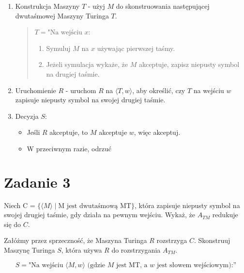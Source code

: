 \documentclass{article}
\begin{document}
\begin{enumerate}
    \item Konstrukcja Maszyny $T$ - użyj $M$ do skonstruowania następującej dwutaśmowej Maszyny Turinga $T$.
    \begin{quote}
    $T = \text{"Na wejściu } x$:
    \begin{enumerate}
        \item Symuluj $M$ na $x$ używając pierwszej taśmy.
        \item Jeżeli symulacja wykaże, że $M$ akceptuje, zapisz niepusty symbol na drugiej taśmie.
    \end{enumerate}
    \end{quote}

    \item Uruchomienie $R$ - uruchom $R$ na $\langle T, w \rangle$, aby określić, czy $T$ na wejściu $w$ zapisuje niepusty symbol na swojej drugiej taśmie.

    \item Decyzja $S$:
    \begin{itemize}
        \item Jeśli $R$ akceptuje, to $M$ akceptuje $w$, więc akceptuj.
        \item W przeciwnym razie, odrzuć
    \end{itemize}
\end{enumerate}

\section{Zadanie 3}
Niech C = $\{\langle M \rangle \mid \text{M  jest dwutaśmową MT}\}$,
która zapisuje niepusty symbol na swojej drugiej taśmie, gdy działa na pewnym wejściu. Wykaż, że $A_{TM}$ redukuje się do $C$.

Załóżmy przez sprzeczność, że Maszyna Turinga $R$ rozstrzyga $C$. Skonstruuj Maszynę Turinga $S$, która używa $R$ do rozstrzygania $A_{TM}$.

$$S = \text{"Na wejściu } \langle M, w \rangle \text{ (gdzie } M \text{ jest MT, a } w \text{ jest słowem wejściowym):''}$$
\end{document}
